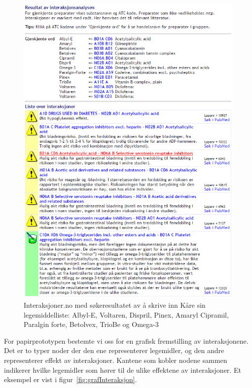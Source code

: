 \begin{figure}[H]
    \centering
    \includegraphics[width=1\textwidth]{fig/utviklingAvPrototype/interaksjoner.PNG}
    \caption{Interaksjoner.no med søkeresultatet av å skrive inn Kåre sin legemiddelliste: Albyl-E, Voltaren, Dispril, Pinex, Amaryl Cipramil, Paralgin forte, Betolvex, TrioBe og Omega-3}
    \label{fig:interaksjoner}
\end{figure}

For papirprototypen bestemte vi oss for en grafisk fremstilling av interaksjonene. Det er to typer noder der den ene representerer legemidler, og den andre representerer effekt av interaksjoner. Kantene som kobler nodene sammen indikerer hvilke legemidler som hører til de ulike effektene av interaksjoner. Et eksempel er vist i figur~\ref{fig:grafInteraksjon}.

